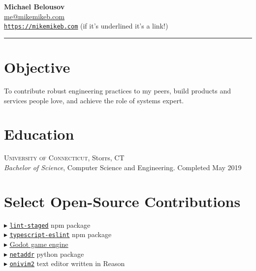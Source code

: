 \documentclass[Letterpaper,11pt]{article}
\newcommand\bul{$\blacktriangleright$ }
\newcommand\link[2]{\href{#1}{\underline{#2}}}
\begin{document}
\setlength{\parindent}{0em}
\setlength{\parskip}{1em}
\setlength{\parsep}{1em}
\setlength{\itemsep}{0.2em}
\setlength{\headsep}{0.2em}
\setlength{\topskip}{0.2em}
\setlength{\topmargin}{0.2em}
\setlength{\topsep}{0.2em}
\setlength{\partopsep}{0.2em}
\setlength{\columnsep}{1em}

\addtolength{\topmargin}{-4em}

\textbf{\Huge Michael Belousov}\\
\link{mailto:mikemikeb@protonmail.com}{me@mikemikeb.com}\\
\link{https://mikemikeb.com}{\texttt{https://mikemikeb.com}} (if it's underlined it's a link!)
\vspace{0.5em} %
\hrule
\vspace{0.5em} %

\section*{Objective}

To contribute robust engineering practices to my peers,
build products and services people love,
and achieve the role of systems expert.

\begin{multicols}{2}

    \section*{Education}
        \textsc{University of Connecticut}, Storrs, CT\\
        \textit{Bachelor of Science}, Computer Science and Engineering. Completed May 2019\\

    \section*{Select Open-Source Contributions}
        \bul \link{https://github.com/okonet/lint-staged}{\texttt{lint-staged}} npm package
        \\
        \bul \link{https://github.com/typescript-eslint/typescript-eslint}{\texttt{typescript-eslint}} npm package
        \\
        \bul \link{https://github.com/godotengine/godot}{Godot game engine}
        \\
        \bul \link{https://github.com/netaddr/netaddr}{\texttt{netaddr}} python package
        \\
        \bul \link{https://github.com/onivim/oni2/pull/2630}{\texttt{onivim2}} text editor written in Reason



\end{multicols}
\end{document}

